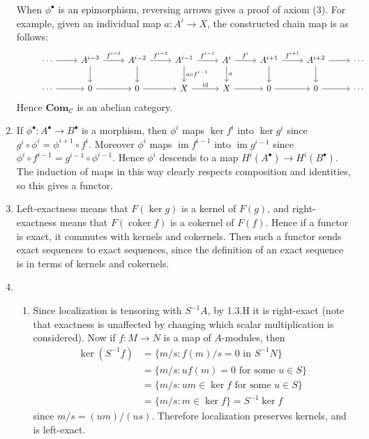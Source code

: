 \documentclass{report}
\newcommand{\cat}[1]{\mathbf{#1}} %
\newcommand{\id}{{\mathrm{id}}} %
\newcommand{\scrC}{\mathscr{C}}
\DeclareMathOperator{\im}{im}
\DeclareMathOperator{\coker}{coker}
\begin{document}
\begin{enumerate}[label=\textbf{1.6.\Alph*.}]
	      When $\phi^\bullet$ is an epimorphism, reversing arrows gives a proof of
	      axiom (3). For example, given an individual map $a:A^i\to X$, the
	      constructed chain map is as follows:
	      \begin{equation*}
		      \begin{tikzcd}
			      &\cdots \arrow{r}
			      &A^{i-3} \arrow{r}{f^{i-3}} \arrow{d}
			      &A^{i-2} \arrow{r}{f^{i-2}} \arrow{d}
			      &A^{i-1} \arrow{r}{f^{i-1}} \arrow{d}{a\circ f^{i-1}}
			      &A^{i} \arrow{r}{f^{i}} \arrow{d}{a}
			      &A^{i+1} \arrow{r}{f^{i+1}} \arrow{d}
			      &A^{i+2} \arrow{r} \arrow{d}
			      &\cdots \\
			      &\cdots \arrow{r}
			      &0 \arrow{r}
			      &0 \arrow{r}
			      &X \arrow{r}{\id}
			      &X \arrow{r}
			      &0 \arrow{r}
			      &0 \arrow{r}
			      &\cdots
		      \end{tikzcd}
	      \end{equation*}
	      Hence $\cat{Com}_\scrC$ is an abelian category.

	\item If $\phi^\bullet:A^\bullet\to B^\bullet$ is a morphism, then $\phi^i$
	      maps $\ker f^i$ into $\ker g^i$ since $g^i\circ\phi^i=\phi^{i+1}\circ f^i$.
	      Moreover $\phi^i$ maps $\im f^{i-1}$ into $\im g^{i-1}$ since
	      $\phi^i\circ f^{i-1}=g^{i-1}\circ\phi^{i-1}$. Hence $\phi^i$ descends to
	      a map $H^i(A^\bullet)\to H^i(B^\bullet)$. The induction of maps in this
	      way clearly respects composition and identities, so this gives a
	      functor.

	\item Left-exactness means that $F(\ker g)$ is a kernel of $F(g)$, and
	      right-exactness means that $F(\coker f)$ is a cokernel of $F(f)$.
	      Hence if a functor is exact, it commutes with kernels and cokernels.
	      Then such a functor sends exact sequences to exact sequences, since
	      the definition of an exact sequence is in terms of kernels and
	      cokernels.

	\item
	      \begin{enumerate}[label=(\alph*)]
		      \item Since localization is tensoring with $S^{-1}A$, by 1.3.H it
		            is right-exact (note that exactness is unaffected by changing
		            which scalar multiplication is considered). Now if $f:M\to N$
		            is a map of $A$-modules, then
		            \begin{align*}
			            \ker(S^{-1}f)
			             & = \{m/s : \text{$f(m)/s=0$ in $S^{-1}N$}\}         \\
			             & = \{m/s : \text{$uf(m)=0$ for some $u\in S$}\}     \\
			             & = \{m/s : \text{$um\in\ker f$ for some $u\in S$}\} \\
			             & = \{m/s : m\in\ker f\} = S^{-1}\ker f
		            \end{align*}
		            since $m/s=(um)/(us)$. Therefore localization preserves
		            kernels, and is left-exact.


\end{enumerate}
\end{enumerate}
\end{document}
